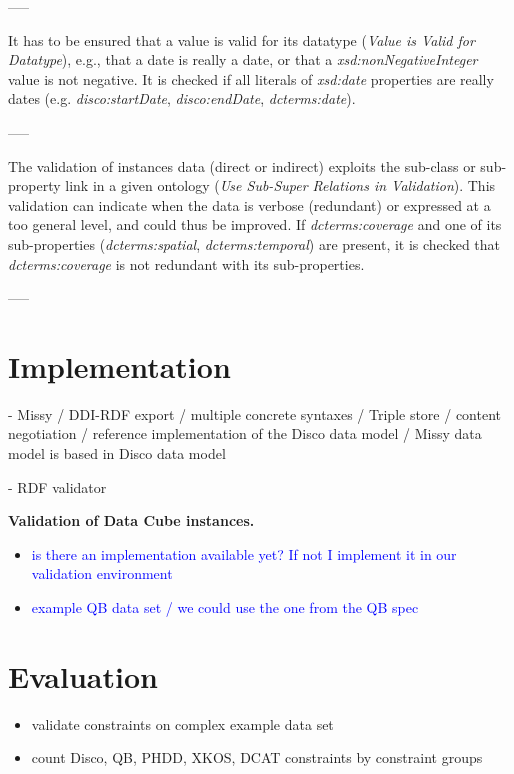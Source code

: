 \documentclass{llncs}
\begin{document}
{{-----

It has to be ensured that a value is valid for its datatype (\emph{Value is Valid for Datatype}), e.g., 
that a date is really a date, or that a \emph{xsd:nonNegativeInteger} value is not negative. 
It is checked if all literals of {\em xsd:date} properties are really dates (e.g. {\em disco:startDate}, {\em disco:endDate}, {\em dcterms:date}).

-----

The validation of instances data (direct or indirect) exploits the sub-class or sub-property link in a given ontology (\emph{Use Sub-Super Relations in Validation}).
This validation can indicate when the data is verbose (redundant) or expressed at a too general level, and could thus be improved.
If \emph{dcterms:coverage} and one of its sub-properties (\emph{dcterms:spatial}, \emph{dcterms:temporal}) are present,
it is checked that \emph{dcterms:coverage} is not redundant with its sub-properties. 

-----

\section{Implementation}

- Missy / DDI-RDF export / multiple concrete syntaxes / Triple store / content negotiation / reference implementation of the Disco data model / Missy data model is based in Disco data model

- RDF validator

\textbf{Validation of Data Cube instances.}
\begin{itemize}
	\item \textcolor{blue}{is there an implementation available yet? If not I implement it in our validation environment}
	\item \textcolor{blue}{example QB data set / we could use the one from the QB spec}
\end{itemize}

\section{Evaluation}

\begin{itemize}
	\item validate constraints on complex example data set
	\item count Disco, QB, PHDD, XKOS, DCAT constraints by constraint groups 
\end{itemize}

}}
\end{document}
